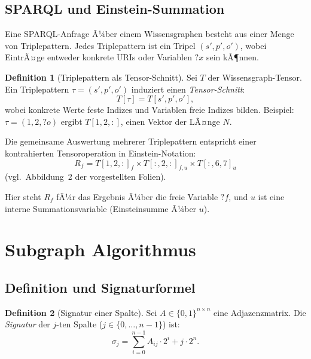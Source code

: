 ﻿\documentclass[a4paper,12pt]{article}
\theoremstyle{definition}
\newtheorem{definition}{Definition}
\begin{document}
\subsection{SPARQL und Einstein-Summation}

Eine SPARQL-Anfrage Ã¼ber einem Wissensgraphen besteht aus einer Menge von
Triplepattern. Jedes Triplepattern ist ein Tripel $(s', p', o')$, wobei EintrÃ¤ge
entweder konkrete URIs oder Variablen $?x$ sein kÃ¶nnen.

\begin{definition}[Triplepattern als Tensor-Schnitt]
Sei $T$ der Wissensgraph-Tensor. Ein Triplepattern $\tau = (s', p', o')$ induziert
einen \emph{Tensor-Schnitt}:
\[
  T[\tau] = T[s', p', o'],
\]
wobei konkrete Werte feste Indizes und Variablen freie Indizes bilden.
Beispiel: $\tau = (1, 2, {?o})$ ergibt $T[1,2,:]$, einen Vektor der LÃ¤nge $N$.
\end{definition}

Die gemeinsame Auswertung mehrerer Triplepattern entspricht einer kontrahierten
Tensoroperation in Einstein-Notation:
\[
  R_f = T[1,2,:]_f \times T[:,2,:]_{f,u} \times T[:,6,7]_u
\]
(vgl.\ Abbildung~2 der vorgestellten Folien).

Hier steht $R_f$ fÃ¼r das Ergebnis Ã¼ber die freie Variable $?f$, und $u$ ist eine
interne Summationsvariable (Einsteinsumme Ã¼ber $u$).

\section{Subgraph Algorithmus}
\label{sec:subgraph}

\subsection{Definition und Signaturformel}

\begin{definition}[Signatur einer Spalte]
Sei $A \in \{0,1\}^{n \times n}$ eine Adjazenzmatrix. Die \emph{Signatur} der
$j$-ten Spalte ($j \in \{0,\ldots,n-1\}$) ist:
\[
  \sigma_j = \sum_{i=0}^{n-1} A_{ij} \cdot 2^i + j \cdot 2^n.
\]
\end{definition}
\end{document}
